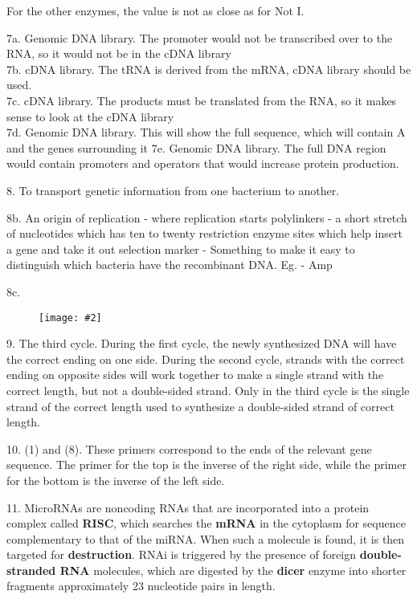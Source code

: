 \documentclass{article}
\newcommand{\makefig}[2]{
\begin{figure}[h]
\centering
\texttt{[image: \#2]}
\end{figure}
}
\begin{document}
For the other enzymes, the value is not as close as for Not I.
\vspace{2mm}

7a. Genomic DNA library. The promoter would not be transcribed over to the RNA, so it would not be in the cDNA library\\
7b. cDNA library. The tRNA  is derived from the mRNA, cDNA library should be used.\\
7c. cDNA library. The products must be translated from the RNA, so it makes sense to look at the cDNA library\\
7d. Genomic DNA library. This will show the full sequence, which will contain A and the genes surrounding it
7e. Genomic DNA library. The full DNA region would contain promoters and operators that would increase protein production. 
\vspace{2mm}

8. To transport genetic information from one bacterium to another.

8b. An origin of replication - where replication starts
polylinkers - a short stretch of nucleotides which has ten to twenty restriction enzyme sites which help insert a gene and take it out
selection marker - Something to make it easy to distinguish which bacteria have the recombinant DNA. Eg. - Amp

8c. \makefig{1}{P8.png}

9. The third cycle. During the first cycle, the newly synthesized DNA will have the correct ending on one side. During the second cycle, strands with the correct ending on opposite sides will work together to make a single strand with the correct length, but not a double-sided strand. Only in the third cycle is the single strand of the correct length used to synthesize a double-sided strand of correct length.

10. (1) and (8). These primers correspond to the ends of the relevant gene sequence. The primer for the top is the inverse of the right side, while the primer for the bottom is the inverse of the left side.
\vspace{2mm}

11. MicroRNAs are noncoding RNAs that are incorporated into a protein
complex called \textbf{RISC}, which searches the \textbf{mRNA} in the cytoplasm for sequence complementary to that of the miRNA. When such a molecule is found, it is then targeted for \textbf{destruction}. RNAi is triggered by the presence of foreign \textbf{double-stranded RNA} molecules, which are digested by the \textbf{dicer} enzyme into shorter fragments approximately 23 nucleotide pairs in length.
\vspace{2mm}
\end{document}
